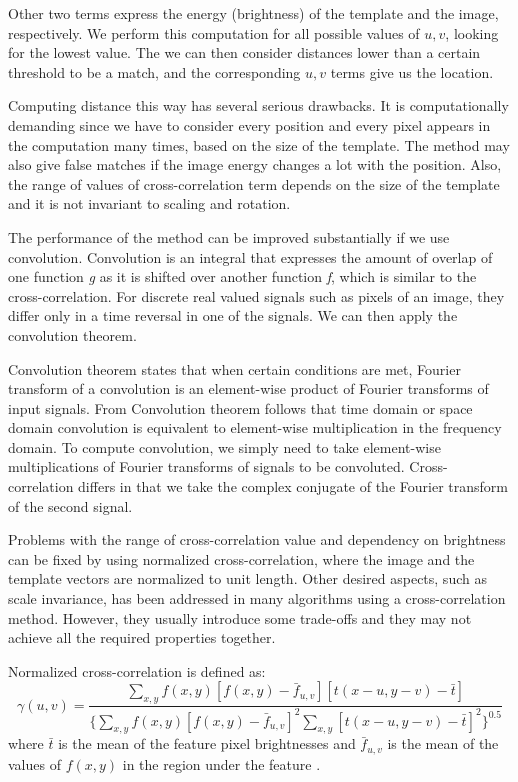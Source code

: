 Other two terms express the energy (brightness) of the template and the image, respectively. We perform this computation for all possible values of $u,v$, looking for the lowest value. The we can then consider distances lower than a certain threshold to be a match, and the corresponding $u,v$ terms give us the location.

Computing distance this way has several serious drawbacks. It is computationally demanding since we have to consider every position and every pixel appears in the computation many times, based on the size of the template. The method may also give false matches if the image energy changes a lot with the position. Also, the range of values of cross-correlation term depends on the size of the template and it is not invariant to scaling and rotation.

The performance of the method can be improved substantially if we use convolution. Convolution is an integral that expresses the amount of overlap of one function \emph{g} as it is shifted over another function \emph{f}, which is similar to the cross-correlation. For discrete real valued signals such as pixels of an image, they differ only in a time reversal in one of the signals. We can then apply the convolution theorem.

Convolution theorem \cite{convtheorem} states that when certain conditions are met, Fourier transform of a convolution is an element-wise product of Fourier transforms of input signals. From Convolution theorem follows that time domain or space domain convolution is equivalent to element-wise multiplication in the frequency domain. To compute convolution, we simply need to take element-wise multiplications of Fourier transforms of signals to be convoluted. Cross-correlation differs in that we take the complex conjugate of the Fourier transform of the second signal.

Problems with the range of cross-correlation value and dependency on brightness can be fixed by using normalized cross-correlation, where the image and the template vectors are normalized to unit length. Other desired aspects, such as scale invariance, has been addressed in many algorithms using a cross-correlation method. However, they usually introduce some trade-offs and they may not achieve all the required properties together.

Normalized cross-correlation is defined as:
\[
\gamma(u,v) = \frac{\sum_{x,y}f(x,y) [f(x,y)-\bar{f}_{u,v}][t(x-u,y-v)-\bar{t}]} {\{ \sum_{x,y}f(x,y) [f(x,y)-\bar{f}_{u,v}]^2 \sum_{x,y}[t(x-u,y-v)-\bar{t}]^2\}^{0.5}}
\]
where $\bar{t}$ is the mean of the feature pixel brightnesses and $\bar{f}_{u,v}$ is the mean of the values of $f(x,y)$ in the region under the feature \cite{crossCorrLewis}.

